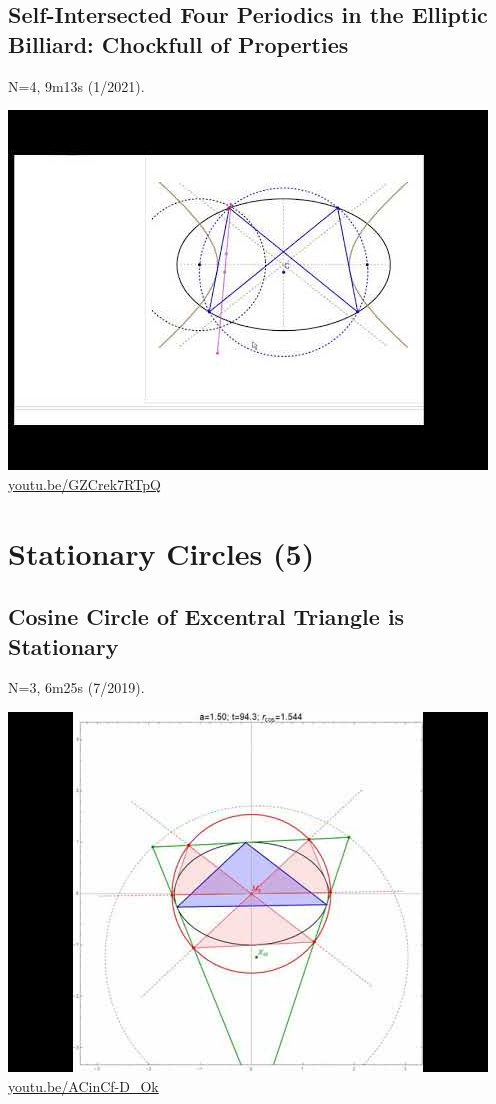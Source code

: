 \documentclass[12pt]{amsart}
\begin{document}
\subsection{Self-Intersected Four Periodics in the Elliptic Billiard: Chockfull of Properties}
\label{vid:GZCrek7RTpQ}
\noindent N=4, 9m13s (1/2021). 
\begin{center}\includegraphics[width=.5\textwidth]{pics/GZCrek7RTpQ.jpg} \\ 
\href{https://youtu.be/GZCrek7RTpQ}{\url{youtu.be/GZCrek7RTpQ}}\end{center}
% 


\section{Stationary Circles (5)}

\subsection{Cosine Circle of Excentral Triangle is Stationary}
\label{vid:ACinCf-D_Ok}
\noindent N=3, 6m25s (7/2019). 
\begin{center}\includegraphics[width=.5\textwidth]{pics/ACinCf-D_Ok.jpg} \\ 
\href{https://youtu.be/ACinCf-D_Ok}{\url{youtu.be/ACinCf-D\_Ok}}\end{center}
% 
\end{document}
